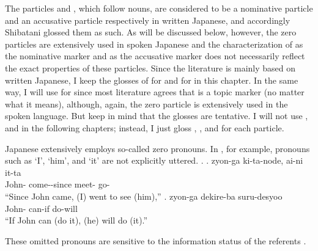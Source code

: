 The particles  and , which follow nouns, are considered to be a nominative particle and an accusative particle respectively in written Japanese,
and accordingly Shibatani glossed them as such.
As will be discussed below, however,
the zero particles are extensively used in spoken Japanese and
the characterization of  as the nominative marker and  as the accusative marker does not necessarily reflect the exact properties of these particles.
Since the literature is mainly based on written Japanese,
I keep the glosses of  for  and  for  in this chapter.
In the same way, I will use  for  since
most literature agrees that  is a topic marker (no matter what it means),
although, again, the zero particle is extensively used in the spoken language.
But keep in mind that the glosses are tentative.
I will not use  , and  in the following chapters;
instead, I just gloss , , and  for each particle.

Japanese extensively employs so-called zero pronouns.
In \Next, for example,
pronouns such as `I', `him', and `it' are not explicitly uttered.
%
\ex.
 \ag. zyon-ga ki-ta-node, ai-ni it-ta \\
      John- come--since meet- go- \\
      ``Since John came, (I) went to see (him),''
 \bg. zyon-ga dekire-ba suru-desyoo \\
      John- can-if do-will \\
      ``If John can (do it), (he) will do (it).''
      \hfill{\cite[17]{kuno73}}

These omitted pronouns are sensitive to the information status of the referents \cite[see][Chapter 1]{kuno78}.


